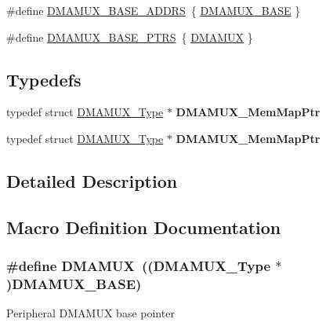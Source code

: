 \begin{DoxyCompactItemize}
\item 
\#define \hyperlink{group__DMAMUX__Peripheral__Access__Layer_ga829aeb2ec17eff9c9fa684315a70bc2a}{D\+M\+A\+M\+U\+X\+\_\+\+B\+A\+S\+E\+\_\+\+A\+D\+D\+RS}~\{ \hyperlink{group__DMAMUX__Peripheral__Access__Layer_gab59b16200deae0e15cd58d322b7cc75b}{D\+M\+A\+M\+U\+X\+\_\+\+B\+A\+SE} \}
\item 
\#define \hyperlink{group__DMAMUX__Peripheral__Access__Layer_gaad218c12978071501dc2899f0624de4b}{D\+M\+A\+M\+U\+X\+\_\+\+B\+A\+S\+E\+\_\+\+P\+T\+RS}~\{ \hyperlink{group__DMAMUX__Peripheral__Access__Layer_ga0b7b7bd666a76aa791434bb59ea03693}{D\+M\+A\+M\+UX} \}
\end{DoxyCompactItemize}
\subsection*{Typedefs}
\begin{DoxyCompactItemize}
\item 
typedef struct \hyperlink{structDMAMUX__Type}{D\+M\+A\+M\+U\+X\+\_\+\+Type} $\ast$ {\bfseries D\+M\+A\+M\+U\+X\+\_\+\+Mem\+Map\+Ptr}\hypertarget{group__DMAMUX__Peripheral__Access__Layer_ga4af0bb6fbf66335c4e98bec5cc0b8055}{}\label{group__DMAMUX__Peripheral__Access__Layer_ga4af0bb6fbf66335c4e98bec5cc0b8055}

\item 
typedef struct \hyperlink{structDMAMUX__Type}{D\+M\+A\+M\+U\+X\+\_\+\+Type} $\ast$ {\bfseries D\+M\+A\+M\+U\+X\+\_\+\+Mem\+Map\+Ptr}\hypertarget{group__DMAMUX__Peripheral__Access__Layer_ga4af0bb6fbf66335c4e98bec5cc0b8055}{}\label{group__DMAMUX__Peripheral__Access__Layer_ga4af0bb6fbf66335c4e98bec5cc0b8055}

\end{DoxyCompactItemize}


\subsection{Detailed Description}


\subsection{Macro Definition Documentation}
\subsubsection[{\texorpdfstring{D\+M\+A\+M\+UX}{DMAMUX}}]{\setlength{\rightskip}{0pt plus 5cm}\#define D\+M\+A\+M\+UX~(({\bf D\+M\+A\+M\+U\+X\+\_\+\+Type} $\ast$){\bf D\+M\+A\+M\+U\+X\+\_\+\+B\+A\+SE})}\hypertarget{group__DMAMUX__Peripheral__Access__Layer_ga0b7b7bd666a76aa791434bb59ea03693}{}\label{group__DMAMUX__Peripheral__Access__Layer_ga0b7b7bd666a76aa791434bb59ea03693}
Peripheral D\+M\+A\+M\+UX base pointer 

